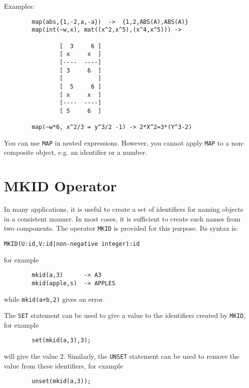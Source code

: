 Examples:
\begin{verbatim}
        map(abs,{1,-2,a,-a})  ->  {1,2,ABS(A),ABS(A)}
        map(int(~w,x), mat((x^2,x^5),(x^4,x^5))) ->

                [  3     6 ]
                [ x     x  ]
                [----  ----]
                [ 3     6  ]
                [          ]
                [  5     6 ]
                [ x     x  ]
                [----  ----]
                [ 5     6  ]

        map(~w*6, x^2/3 = y^3/2 -1) -> 2*X^2=3*(Y^3-2)
\end{verbatim}

You can use \texttt{MAP} in nested expressions. However, you cannot
apply \texttt{MAP} to a non-composite object, e.g. an identifier or a number.


\section{MKID Operator}
\hypertarget{operator:MKID}{}
In many applications, it is useful to create a set of identifiers for
naming objects in a consistent manner. In most cases, it is sufficient to
create such names from two components. The operator \texttt{MKID} is provided
for this purpose. Its syntax is:
\begin{verbatim}
MKID(U:id,V:id|non-negative integer):id
\end{verbatim}
for example
\begin{verbatim}
        mkid(a,3)      -> A3
        mkid(apple,s)  -> APPLES
\end{verbatim}
while \texttt{mkid(a+b,2)} gives an error.

The \texttt{SET} statement can be used to give a value to the
identifiers created by \texttt{MKID}, for example
\begin{verbatim}
        set(mkid(a,3),3);
\end{verbatim}
will give  the value 2.
Similarly, the \texttt{UNSET} statement can be used to
remove the value from these identifiers, for example
\begin{verbatim}
        unset(mkid(a,3));
\end{verbatim}

